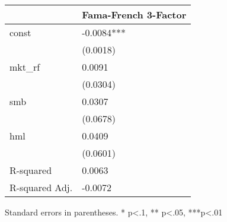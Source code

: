 \begin{table}
\caption{}
\label{}
\begin{center}
\begin{tabular}{ll}
\hline
               & Fama-French 3-Factor  \\
\hline
const          & -0.0084***            \\
               & (0.0018)              \\
mkt\_rf        & 0.0091                \\
               & (0.0304)              \\
smb            & 0.0307                \\
               & (0.0678)              \\
hml            & 0.0409                \\
               & (0.0601)              \\
R-squared      & 0.0063                \\
R-squared Adj. & -0.0072               \\
\hline
\end{tabular}
\end{center}
\end{table}
\bigskip
Standard errors in parentheses. \newline 
* p<.1, ** p<.05, ***p<.01